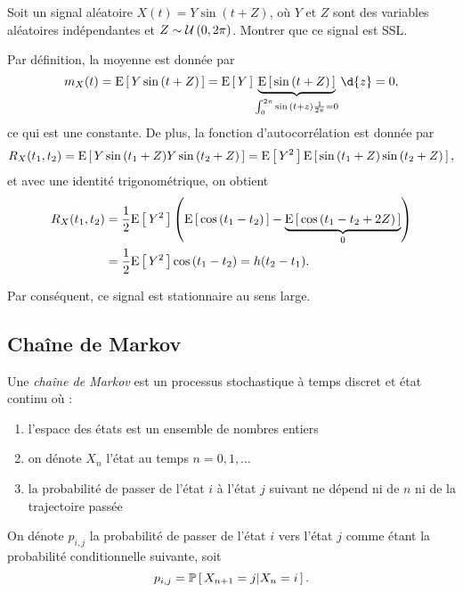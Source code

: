 \documentclass[11pt]{article}
\newcommand\Pg[2]{%
	\ensuremath{%
		\mathbb{P}\left[\,#1\middle\rvert#2\,\right]%
	}%
}%
\newcommand\Uni[2]{%
	\ensuremath{%
		\mathcal{U}\left(#1,#2\right)%
	}%
}%
\newcommand\Esp[1]{%
	\ensuremath{%
		\mathrm{E}\left[\,#1\,\right]%
	}%
}%
\begin{document}
\begin{exemple}
	Soit un signal aléatoire $X(t)=Y\sin{(t+Z)}$, où $Y$ et $Z$ sont des
	variables aléatoires indépendantes et $Z\sim\Uni{0}{2\pi}$. Montrer que ce
	signal est SSL.

	Par définition, la moyenne est donnée par
	\begin{equation*}
		m_X(t)
		=\Esp{Y\sin{(t+Z)}}
		=\Esp{Y}\underbrace{\Esp{\sin{(t+Z)}}}_{
			\int_0^{2\pi}\sin{(t+z)}\frac{1}{2\pi}=0}\d{z}
		=0,
	\end{equation*}
	ce qui est une constante. De plus, la fonction d'autocorrélation est donnée
	par
	\begin{equation*}
		R_X(t_1,t_2)
		=\Esp{Y\sin{(t_1+Z)}Y\sin{(t_2+Z)}}
		=\Esp{Y^2}\Esp{\sin{(t_1+Z)}\sin{(t_2+Z)}},
	\end{equation*}
	et avec une identité trigonométrique, on obtient
	\begin{equation*}
		\begin{split}
			R_X(t_1,t_2)
			&=\frac{1}{2}\Esp{Y^2}\left(
				\Esp{\cos{(t_1-t_2)}}-\underbrace{\Esp{\cos{(t_1-t_2+2Z)}}}_0
			\right)\\
			&=\frac{1}{2}\Esp{Y^2}\cos{(t_1-t_2)}
			=h(t_2-t_1).
		\end{split}
	\end{equation*}

	Par conséquent, ce signal est stationnaire au sens large.
\end{exemple}

\subsection{Chaîne de Markov}
\begin{definition}
	Une \textit{chaîne de Markov} est un processus stochastique à temps discret
	et état continu où :
	\begin{enumerate}
		\item l'espace des états est un ensemble de nombres entiers
		\item on dénote $X_n$ l'état au temps $n=0,1,\dots$
		\item la probabilité de passer de l'état $i$ à l'état $j$ suivant ne
		      dépend ni de $n$ ni de la trajectoire passée
	\end{enumerate}
\end{definition}

On dénote $p_{i,j}$ la probabilité de passer de l'état $i$ vers l'état $j$
comme étant la probabilité conditionnelle suivante, soit
\begin{equation*}
	p_{i,j}=\Pg{X_{n+1}=j}{X_n=i}.
\end{equation*}
\end{document}
